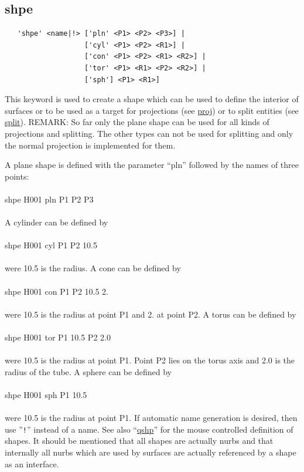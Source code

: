 \documentclass{article}
\providecommand{\htmlref}[2]{\hyperref[#2]{#1}}
\begin{document}
\subsection{\label{shpe}shpe}
\begin{verbatim}
   'shpe' <name|!> ['pln' <P1> <P2> <P3>] |
                   ['cyl' <P1> <P2> <R1>] |
                   ['con' <P1> <P2> <R1> <R2>] |
                   ['tor' <P1> <R1> <P2> <R2>] |
                   ['sph'] <P1> <R1>]
\end{verbatim}
This keyword is used to create a shape which can be used to define the interior of surfaces or to be used as a target for projections (see \htmlref{proj}{proj}) or to split entities (see \htmlref{split}{split}). REMARK: So far only the plane shape can be used for all kinds of projections and splitting. The other types can not be used for splitting and only the normal projection is implemented for them.

A plane shape is defined with the parameter ``pln'' followed by the names of three points:\\\\shpe H001 pln P1 P2 P3\\\\A cylinder can be defined by\\\\shpe H001 cyl P1 P2 10.5\\\\were 10.5 is the radius. A cone can be defined by\\\\shpe H001 con P1 P2 10.5 2.\\\\were 10.5 is the radius at point P1 and 2. at point P2. A torus can be defined by\\\\shpe H001 tor P1 10.5 P2 2.0\\\\were 10.5 is the radius at point P1. Point P2 lies on the torus axis and 2.0 is the radius of the tube. A sphere can be defined by\\\\shpe H001 sph P1 10.5\\\\were 10.5 is the radius at point P1. If automatic name generation is desired, then use ''\verb_!_'' instead of a name. See also ``\htmlref{qshp}{qshp}'' for the mouse controlled definition of shapes. It should be mentioned that all shapes are actually nurbs and that internally all nurbs which are used by surfaces are actually referenced by a shape as an interface.
\end{document}
